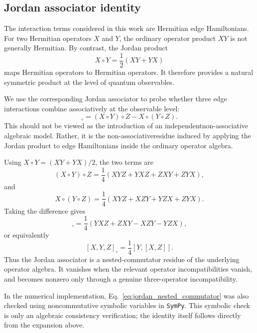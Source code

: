 \documentclass[aps,physrev,preprint,groupedaddress]{revtex4-2}
\begin{document}
\subsection{Jordan associator identity}\label{sm:algebra-assoc_identity}
The interaction terms considered in this work are Hermitian edge Hamiltonians. For two Hermitian operators $X$ and $Y$, the ordinary operator product $XY$ is not generally Hermitian. By contrast, the
Jordan product
\begin{equation}
    X\circ Y = \frac{1}{2}(XY+YX)
\end{equation}
maps Hermitian operators to Hermitian operators. It therefore provides a natural symmetric product at the level of quantum observables.

We use the corresponding Jordan associator to probe whether three edge interactions combine associatively at the observable level:
\begin{equation}
    [X,Y,Z]_{\circ} = (X\circ Y)\circ Z - X\circ (Y\circ Z).
\end{equation}
This should not be viewed as the introduction of an independentnon-associative algebraic model. Rather, it is the non-associativeresidue induced by applying the Jordan product to edge Hamiltonians inside the ordinary operator algebra.

Using $X\circ Y=(XY+YX)/2$, the two terms are
\begin{equation}
    (X\circ Y)\circ Z = \frac{1}{4} (XYZ+YXZ+ZXY+ZYX),
\end{equation}
and
\begin{equation}
    X\circ (Y\circ Z) = \frac{1}{4}(XYZ+XZY+YZX+ZYX).
\end{equation}
Taking the difference gives
\begin{equation}
    [X,Y,Z]_{\circ} = \frac{1}{4}(YXZ+ZXY-XZY-YZX),
\end{equation}
or equivalently
\begin{equation}\label{eq:jordan_nested_commutator}
    [X,Y,Z]_{\circ} = \frac{1}{4}[Y,[X,Z]].
\end{equation}
Thus the Jordan associator is a nested-commutator residue of the underlying operator algebra. It vanishes when the relevant operator incompatibilities vanish, and becomes nonzero only through a genuine three-operator incompatibility.

In the numerical implementation, Eq.~\eqref{eq:jordan_nested_commutator} was also checked using noncommutative symbolic variables in \texttt{SymPy}. This symbolic check is only an algebraic consistency verification; the identity itself follows directly from the expansion
above.
\end{document}
